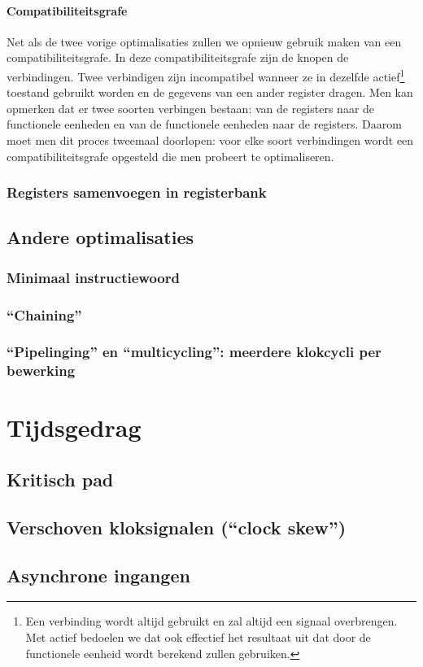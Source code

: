 \paragraph{Compatibiliteitsgrafe}Net als de twee vorige optimalisaties zullen we opnieuw gebruik maken van een compatibiliteitsgrafe. In deze compatibiliteitsgrafe zijn de knopen de verbindingen. Twee verbindigen zijn incompatibel wanneer ze in dezelfde actief\footnote{Een verbinding wordt altijd gebruikt en zal altijd een signaal overbrengen. Met actief bedoelen we dat ook effectief het resultaat uit dat door de functionele eenheid wordt berekend zullen gebruiken.} toestand gebruikt worden en de gegevens van een ander register dragen. Men kan opmerken dat er twee soorten verbingen bestaan: van de registers naar de functionele eenheden en van de functionele eenheden naar de registers. Daarom moet men dit proces tweemaal doorlopen: voor elke soort verbindingen wordt een compatibiliteitsgrafe opgesteld die men probeert te optimaliseren.
\subsubsection{Registers samenvoegen in registerbank}
\subsection{Andere optimalisaties}
\label{ss:syntheseFSMDOptimal}
\subsubsection{Minimaal instructiewoord}
\subsubsection{``Chaining''}
\subsubsection{``Pipelinging'' en ``multicycling'': meerdere klokcycli per bewerking}
\section{Tijdsgedrag}
\label{s:timeFSMD}
\subsection{Kritisch pad}
\subsection{Verschoven kloksignalen (``clock skew'')}
\subsection{Asynchrone ingangen}
